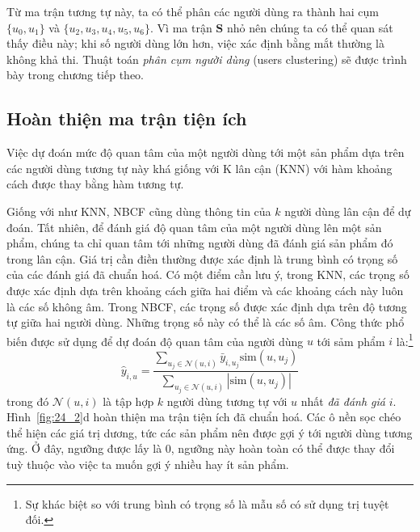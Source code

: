 Từ ma trận tương tự này, ta có thể phân các người dùng ra thành hai cụm $\{u_0,
u_1\}$ và $\{u_2, u_3, u_4, u_5, u_6\}$. Vì ma trận $\mathbf{S}$ nhỏ nên chúng ta
có thể quan sát thấy điều này; khi số người dùng lớn hơn, việc xác định bằng mắt
thường là không khả thi. Thuật toán \textit{phân cụm người dùng} ({users
clustering}) sẽ được trình bày trong chương tiếp theo.
 
 
 
 
 
 
\subsection{Hoàn thiện ma trận tiện ích}
 
Việc {dự đoán mức độ quan tâm} của một
người dùng tới một sản phẩm dựa trên các người dùng tương tự này khá giống với 
{K lân cận} (KNN) với hàm khoảng cách được thay bằng hàm tương tự. 
 
Giống với như KNN, NBCF cũng dùng thông tin của $k$ người dùng lân cận để dự
đoán. Tất nhiên, để đánh giá độ quan tâm của một người dùng lên một
sản phẩm, chúng ta chỉ quan tâm tới những người dùng
đã đánh giá sản phẩm đó trong lân cận. {Giá trị cần điền} thường được xác
định là {trung bình có trọng số} của các đánh giá đã chuẩn hoá. Có một điểm cần lưu ý, trong KNN, các trọng số được xác định dựa trên
khoảng cách giữa hai điểm và các khoảng cách này luôn là các số không âm.
Trong NBCF, các trọng số được xác định dựa trên độ tương tự giữa hai
người dùng. Những trọng số này có thể là các số âm. Công thức phổ biến được sử
dụng để dự đoán độ quan tâm của người dùng $u$ tới sảm phẩm $i$
là:\footnote{Sự khác biệt so với trung bình có trọng số là mẫu số có sử dụng trị
tuyệt đối.}
\begin{equation} 
\hat{y}_{i, u} = \frac{\sum_{u_j \in \mathcal{N}(u, i)} \bar{y}_{i, u_j} \text{sim}(u, u_j)}{\sum_{u_j \in \mathcal{N}(u, i)} |\text{sim}(u, u_j)|}
\end{equation} 
trong đó $\mathcal{N}(u, i)$ là tập hợp $k$ người dùng tương tự với $u$ nhất \textit{đã đánh giá} $i$.
Hình~\ref{fig:24_2}d hoàn thiện
ma trận tiện ích đã chuẩn hoá. Các ô
nền sọc chéo thể hiện các giá trị dương, tức các sản phẩm nên được gợi ý tới người dùng tương ứng. Ở đây, ngưỡng được lấy là 0, ngưỡng này
hoàn toàn có thể được thay đổi tuỳ thuộc vào việc ta muốn gợi ý nhiều hay ít
sản phẩm. 

